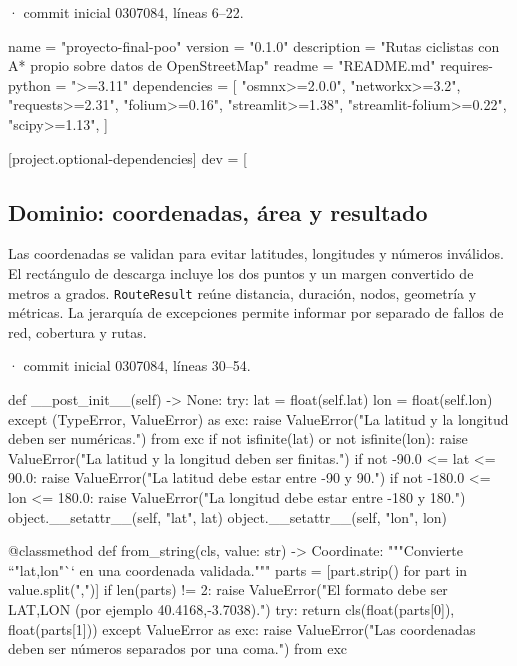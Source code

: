 \documentclass[11pt,a4paper]{article}
\begin{document}
\smallskip
{\footnotesize\texttt{} · commit inicial 0307084, líneas 6--22.}\par
\begin{Codigo}[firstnumber=6]
name = "proyecto-final-poo"
version = "0.1.0"
description = "Rutas ciclistas con A* propio sobre datos de OpenStreetMap"
readme = "README.md"
requires-python = ">=3.11"
dependencies = [
    "osmnx>=2.0.0",
    "networkx>=3.2",
    "requests>=2.31",
    "folium>=0.16",
    "streamlit>=1.38",
    "streamlit-folium>=0.22",
    "scipy>=1.13",
]

[project.optional-dependencies]
dev = [
\end{Codigo}

\subsection{Dominio: coordenadas, área y resultado}
Las coordenadas se validan para evitar latitudes, longitudes y números inválidos. El rectángulo de descarga incluye los dos puntos y un margen convertido de metros a grados. \texttt{RouteResult} reúne distancia, duración, nodos, geometría y métricas. La jerarquía de excepciones permite informar por separado de fallos de red, cobertura y rutas.

\smallskip
{\footnotesize\texttt{} · commit inicial 0307084, líneas 30--54.}\par
\begin{Codigo}[firstnumber=30]
    def __post_init__(self) -> None:
        try:
            lat = float(self.lat)
            lon = float(self.lon)
        except (TypeError, ValueError) as exc:
            raise ValueError("La latitud y la longitud deben ser numéricas.") from exc
        if not isfinite(lat) or not isfinite(lon):
            raise ValueError("La latitud y la longitud deben ser finitas.")
        if not -90.0 <= lat <= 90.0:
            raise ValueError("La latitud debe estar entre -90 y 90.")
        if not -180.0 <= lon <= 180.0:
            raise ValueError("La longitud debe estar entre -180 y 180.")
        object.__setattr__(self, "lat", lat)
        object.__setattr__(self, "lon", lon)

    @classmethod
    def from_string(cls, value: str) -> Coordinate:
        """Convierte ``"lat,lon"`` en una coordenada validada."""
        parts = [part.strip() for part in value.split(",")]
        if len(parts) != 2:
            raise ValueError("El formato debe ser LAT,LON (por ejemplo 40.4168,-3.7038).")
        try:
            return cls(float(parts[0]), float(parts[1]))
        except ValueError as exc:
            raise ValueError("Las coordenadas deben ser números separados por una coma.") from exc
\end{Codigo}
\end{document}
